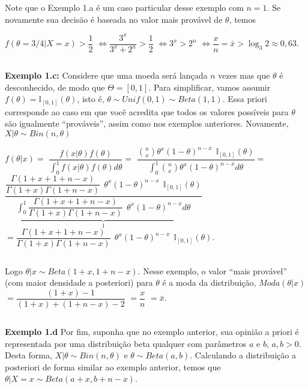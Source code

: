 \documentclass[
]{book}
\begin{document}
\(~\)

Note que o Exemplo 1.a é um caso particular desse exemplo com \(n=1\). Se novamente sua decisão é baseada no valor mais provável de \(\theta\), temos

\(f(\theta=3/4|X=x) > \dfrac{1}{2}\) \(\Longleftrightarrow \dfrac{3^x}{3^x + 2^n} > \dfrac{1}{2}\) \(\Longleftrightarrow {3^x} > {2^n}\) \(\Longleftrightarrow \dfrac{x}{n} = \bar{x} > \log_3{2}\approx 0,63\).

\(~\)

\textbf{Exemplo 1.c:} Considere que uma moeda será lançada \(n\) vezes mas que \(\theta\) é desconhecido, de modo que \(\Theta = [0,1]\). Para simplificar, vamos assumir \(f(\theta)=\mathbb{I}_{[0,1]}(\theta)\), isto é, \(\theta \sim Unif(0,1)\sim Beta(1,1)\). Essa priori corresponde ao caso em que você acredita que todos os valores possíveis para \(\theta\) são igualmente ``prováveis'', assim como nos exemplos anteriores. Novamente, \(X|\theta \sim Bin(n,\theta)\)

\(f(\theta|x)=\) \(\dfrac{f(x|\theta)f(\theta)}{\int_0^1 f(x|\theta)f(\theta)d\theta}=\) \(\dfrac{\binom{n}{x}\theta^x(1-\theta)^{n-x} ~~\mathbb{I}_{[0,1]}(\theta)}{\int_0^1\binom{n}{x}\theta^x(1-\theta)^{n-x}d\theta}=\) \(\dfrac{\dfrac{\Gamma(1+x+1+n-x)}{\Gamma(1+x)\Gamma(1+n-x)}~~\theta^x(1-\theta)^{n-x}~~\mathbb{I}_{[0,1]}(\theta)}{\underbrace{\displaystyle \int_0^1\dfrac{\Gamma(1+x+1+n-x)}{\Gamma(1+x)\Gamma(1+n-x)}~~\theta^x(1-\theta)^{n-x}d\theta}_{1}}\) \(=\dfrac{\Gamma(1+x+1+n-x)}{\Gamma(1+x)\Gamma(1+n-x)}~~\theta^x(1-\theta)^{n-x}~~\mathbb{I}_{[0,1]}(\theta)\).

\(~\)

Logo \(\theta|x \sim Beta(1+x,1+n-x)\). Nesse exemplo, o valor ``mais provável'' (com maior densidade a posteriori) para \(\theta\) é a moda da distribuição, \(Moda(\theta|x)\) \(= \dfrac{(1+x)-1}{(1+x)+(1+n-x)-2}\) \(= \dfrac{x}{n}\) \(=\bar{x}\).

\(~\)

\textbf{Exemplo 1.d} Por fim, suponha que no exemplo anterior, sua opinião a priori é representada por uma distribuição beta qualquer com parâmetros \(a\) e \(b\), \(a,b > 0\). Desta forma, \(X|\theta \sim Bin(n,\theta)\) e \(\theta\sim Beta(a,b)\). Calculando a distribuição a posteriori de forma similar ao exemplo anterior, temos que \(\theta|X=x \sim Beta(a+x,b+n-x)\).

\(~\)
\end{document}
